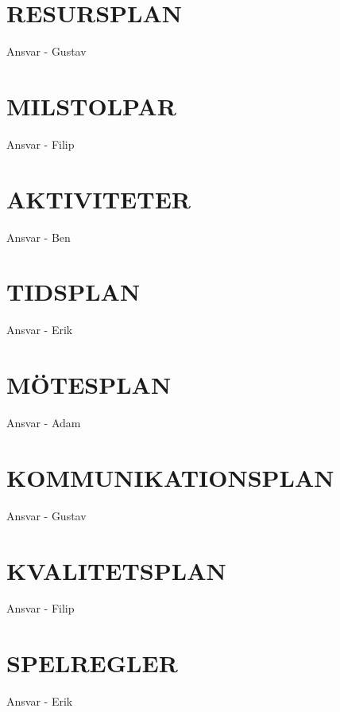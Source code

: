 \documentclass[a4paper]{article}
\begin{document}
\section{RESURSPLAN}
\label{sec:resurs}

Ansvar - Gustav

\section{MILSTOLPAR}
\label{sec:milstolpar}

Ansvar - Filip

\section{AKTIVITETER}
\label{sec:sktiviteter}

Ansvar - Ben

\section{TIDSPLAN}
\label{sec:tidsplan}

Ansvar - Erik

\section{MÖTESPLAN}
\label{sec:mötesplan}

Ansvar - Adam

\section{KOMMUNIKATIONSPLAN}
\label{sec:komm}

Ansvar - Gustav

\section{KVALITETSPLAN}
\label{sec:kval}

Ansvar - Filip

\section{SPELREGLER}
\label{sec:spelregler}

Ansvar - Erik

%
%
\end{document}
